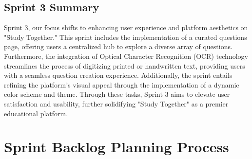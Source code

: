 \subsection{Sprint 3 Summary}
Sprint 3, our focus shifts to enhancing user experience and platform aesthetics on "Study Together." This sprint includes the implementation of a curated questions page, offering users a centralized hub to explore a diverse array of questions. Furthermore, the integration of Optical Character Recognition (OCR) technology streamlines the process of digitizing printed or handwritten text, providing users with a seamless question creation experience. Additionally, the sprint entails refining the platform's visual appeal through the implementation of a dynamic color scheme and theme. Through these tasks, Sprint 3 aims to elevate user satisfaction and usability, further solidifying "Study Together" as a premier educational platform.

\section{Sprint Backlog Planning Process}




